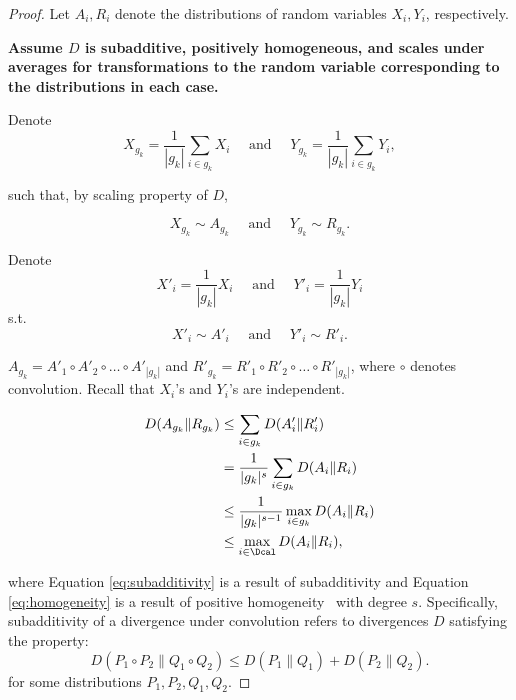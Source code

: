 \begin{proof}
\newcommand{\Xgk}{X_{g_{k}}}
\newcommand{\Ygk}{Y_{g_{k}}}
\newcommand{\sumXgk}{\frac{1}{|g_k|}\sum_{i\in g_k} X_{i}}
\newcommand{\sumYgk}{\frac{1}{|g_k|}\sum_{i\in g_k} Y_{i}}
Let $A_i, R_i$ denote the distributions of random variables $X_i, Y_i$, respectively. 

{\bf Assume $D$ is subadditive, positively homogeneous, and scales under averages for transformations to the random variable corresponding to the distributions in each case.}

Denote 
\begin{equation}
    X_{g_k} = \frac{1}{|g_k|}\sum_{i\in g_k} X_i \quad \text{ and } \quad Y_{g_k} = \frac{1}{|g_k|}\sum_{i\in g_k} Y_i,
\end{equation}

such that, by scaling property of $D$,

\begin{equation}
    X_{g_k} \sim A_{g_k} \quad \text{ and } \quad Y_{g_k} \sim R_{g_k}.
\end{equation}

Denote $$X'_i = \frac{1}{|g_k|}X_i \quad \text{ and } \quad Y'_i = \frac{1}{|g_k|}Y_i$$ s.t. $$X'_i \sim A'_i \quad \text{ and } \quad Y'_i \sim R'_i .$$

$A_{g_k} = A'_1 \circ A'_2 \circ \ldots \circ A'_{|g_k|}$ and $R'_{g_k} = R'_1 \circ R'_2 \circ \ldots \circ R'_{|g_k|}$, where $\circ$ denotes convolution. Recall that $X_i$'s and $Y_i$'s are independent.

\begin{align}
    D(A_{g_k}  \| R_{g_k}) &\le \sum_{i\in g_k} D(A'_i \| R'_i) \label{eq:subadditivity} \\
    &= \frac{1}{|g_k|^s}\sum_{i\in g_k} D(A_i \| R_i) \label{eq:homogeneity} \\
    &\le \frac{1}{|g_k|^{s-1}} \max_{i\in g_k} D(A_i \| R_i) \\
    &\le \max_{i\in \Dcal} D(A_i \| R_i) \label{eq:assumption_groups},
\end{align}

where Equation \ref{eq:subadditivity} is a result of subadditivity and Equation \ref{eq:homogeneity} is a result of positive homogeneity~\cite{kanamori2014scale} with degree $s$. Specifically, subadditivity of a divergence under convolution refers to divergences $D$ satisfying the property:
\[
D(P_1 \circ P_2 \| Q_1 \circ Q_2) \leq D(P_1 \| Q_1 ) + D(P_2 \| Q_2).
\] for some distributions $P_1, P_2, Q_1, Q_2$.


\end{proof}
